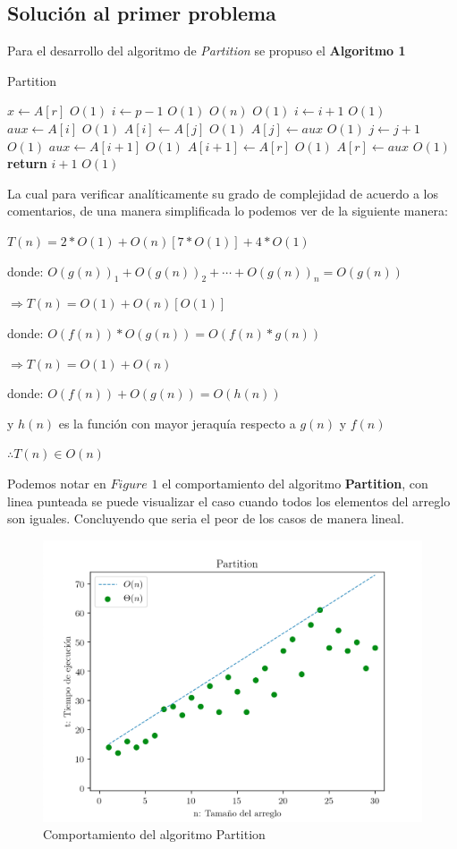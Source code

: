 \documentclass[12pt,twoside]{article}
\begin{document}
\subsection{\textbf{Solución al primer problema}}

Para el desarrollo del algoritmo de \textit{Partition} se propuso el \textbf{Algoritmo 1}

\begin{algorithm}
  \caption{Partition}\label{euclid}
  \begin{algorithmic}[1]
      \State $x \gets A[r]$ \Comment $O(1)$
      \State $i\gets p - 1$ \Comment $O(1)$
       \Comment $O(n)$
         \Comment $O(1)$
          \State $i \gets i + 1$ \Comment $O(1)$
          \State $aux \gets A[i]$ \Comment $O(1)$
          \State $A[i] \gets A[j]$ \Comment $O(1)$
          \State $A[j] \gets aux$ \Comment $O(1)$
        \EndIf
        \State $j \gets j + 1$ \Comment $O(1)$
      \EndFor
      \State $aux \gets A[i+1]$ \Comment $O(1)$
      \State $A[i+1] \gets A[r]$ \Comment $O(1)$
      \State $A[r] \gets aux$ \Comment $O(1)$
      \State \textbf{return} $i + 1$ \Comment $O(1)$
  \EndFunction
  \end{algorithmic}
\end{algorithm}

La cual para verificar analíticamente su grado de complejidad de acuerdo a los comentarios, de una manera simplificada lo podemos ver de la siguiente
manera: 

\centerline{$T(n) = 2*O(1)+O(n)[7*O(1)]+4*O(1)$}
\centerline{}
\centerline{donde: $O(g(n))_{1} + O(g(n))_{2}+\cdots+O(g(n))_n = O(g(n))$}
\centerline{}
\centerline{$\Rightarrow T(n) = O(1)+O(n)[O(1)]$}
\centerline{}
\centerline{donde: $O(f(n)) * O(g(n))= O(f(n)*g(n))$}
\centerline{}
\centerline{$\Rightarrow T(n) = O(1) + O(n)$}
\centerline{}
\centerline{donde: $O(f(n)) + O(g(n)) = O(h(n))$}
\centerline{y $h(n)$ es la funci\'on con mayor jeraqu\'ia respecto a $g(n)$ y $f(n)$}
\centerline{}
\centerline{$\therefore T(n) \in O(n)$}

Podemos notar en $Figure$ $1$ el comportamiento del algoritmo \textbf{Partition}, con linea punteada se puede visualizar el caso cuando todos los 
elementos del arreglo son iguales. Concluyendo que seria el peor de los casos de manera lineal.
\begin{figure}
  \centering
    \includegraphics[height=0.5\textwidth]{Figure1}
  \caption{Comportamiento del algoritmo Partition}
  \label{fig:ejemplo1}
\end{figure}
\end{document}
